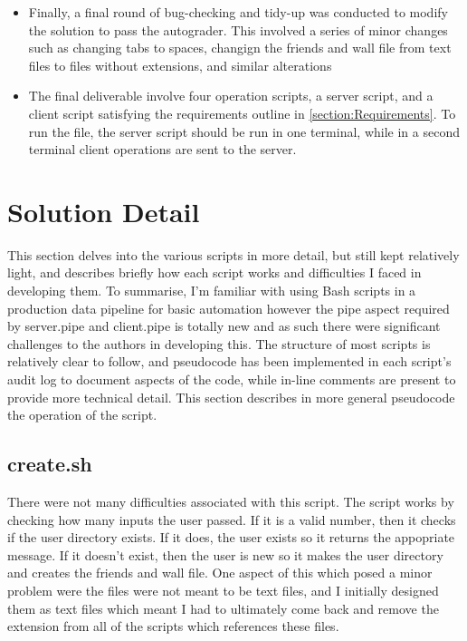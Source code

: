 \documentclass[11pt]{article}
\theoremstyle{plain}
\theoremstyle{definition}
\begin{document}
\begin{itemize}
	\item Finally, a final round of bug-checking and tidy-up was conducted to modify the solution to pass the autograder. This involved a series of minor changes such as changing tabs to spaces, changign the friends and wall file from text files to files without extensions, and similar alterations
	\item The final deliverable involve four operation scripts, a server script, and a client script satisfying the requirements outline in \ref{section:Requirements}. To run the file, the server script should be run in one terminal, while in a second terminal client operations are sent to the server.
\end{itemize}
\section{Solution Detail}\label{section: SolutionDetail}
This section delves into the various scripts in more detail, but still kept relatively light, and describes briefly how each script works and difficulties I faced in developing them. To summarise, I'm familiar with using Bash scripts in a production data pipeline for basic automation however the pipe aspect required by server.pipe and client.pipe is totally new and as such there were significant challenges to the authors in developing this. The structure of most scripts is relatively clear to follow, and pseudocode has been implemented in each script's audit log to document aspects of the code, while in-line comments are present to provide more technical detail. This section describes in more general pseudocode the operation of the script.

\subsection{create.sh}\label{subsection: Create}
There were not many difficulties associated with this script. The script works by checking how many inputs the user passed. If it is a valid number, then it checks if the user directory exists. If it does, the user exists so it returns the appopriate message. If it doesn't exist, then the user is new so it makes the user directory and creates the friends and wall file. One aspect of this which posed a minor problem were the files were not meant to be text files, and I initially designed them as text files which meant I had to ultimately come back and remove the extension from all of the scripts which references these files.
\end{document}

